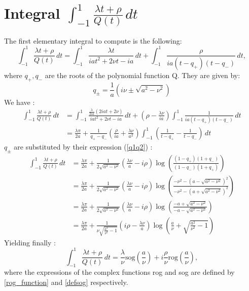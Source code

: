 \section[First elementary integral]{Integral $\int_{-1}^1 \frac{\lambda t+ \rho}{Q(t)}\, dt$}
\label{calculIntQ}
The first elementary integral to compute is the following:
\begin{equation}
\int_{-1}^1 \frac{\lambda t+ \rho}{Q(t)}\, dt=\int_{-1}^1 \frac{\lambda t}{iat^2+2\nu t-ia}\,dt+\int_{-1}^1\frac{\rho}{ia(t-q_+)(t-q_-)}\,dt,
\end{equation}
where $q_+,q_-$ are the roots of the polynomial function Q. They are given by:
\begin{equation}
q_\pm=\frac{1}{a}(i\nu\pm\sqrt{a^2-\nu^2})
\label{q1q2}
\end{equation}
We have :
\begin{equation}
\begin{split}
\int_{-1}^1 \frac{\lambda t+ \rho}{Q(t)}\, dt&=\int_{-1}^1 \frac{\frac{\lambda}{2ia} (2iat+2\nu)}{iat^2+2\nu t-ia}\,dt+(\rho-\frac{\lambda \nu}{ia})\int_{-1}^1\frac{1}{ia(t-q_+)(t-q_-)}\,dt\\
&=\frac{\lambda\pi}{2a}+\frac{1}{q_+-q_-}\left(\frac{\rho}{ia}+\frac{\lambda\nu}{a^2}\right)\int_{-1}^1\left(\frac{1}{t-q_+}-\frac{1}{t-q_-}\right)\,dt
\end{split}
\end{equation}
$q_\pm$ are substituted by their expression (\ref{q1q2}) :
\begin{equation}
\begin{split}
\int_{-1}^1 \frac{\lambda t+ \rho}{Q(t)}\, dt&=\frac{\lambda\pi}{2a}+\frac{1}{2\sqrt{a^2-\nu^2}}\left(\frac{\lambda\nu}{a}-i\rho\right)\log\left(\frac{(1-q_+)(1+q_-)}{(1-q_-)(1+q_+)}\right)\\
&=\frac{\lambda\pi}{2a}+\frac{1}{2\sqrt{a^2-\nu^2}}\left(\frac{\lambda\nu}{a}-i\rho\right)\log\left(\frac{-\nu^2-(a-\sqrt{a^2-\nu^2})^2}{-\nu^2-(a+\sqrt{a^2-\nu^2})^2}\right)\\
&=\frac{\lambda\pi}{2a}+\frac{1}{2\sqrt{a^2-\nu^2}}\left(\frac{\lambda\nu}{a}-i\rho\right)\log\left(\frac{-a+\sqrt{a^2-\nu^2}}{-a-\sqrt{a^2-\nu^2}}\right)\\
&=\frac{\lambda\pi}{2a}+\frac{1}{\nu\sqrt{\frac{a^2}{\nu^2}-1}}\left(i\rho-\frac{\lambda\nu}{a}\right)\log\left(\frac{a}{\nu}+\sqrt{\frac{a^2}{\nu^2}-1}\right)
\end{split}
\end{equation}
Yielding finally :
\begin{equation}
\int_{-1}^1 \frac{\lambda t+ \rho}{Q(t)}\, dt=\frac{\lambda}{\nu}\mbox{sog}(\frac{a}{\nu})+i\frac{\rho}{\nu}\mbox{rog}(\frac{a}{\nu}),
\label{intQ}
\end{equation}
where the expressions of the complex functions rog and sog are defined by \eqref{rog_function} and \eqref{defsog} respectively.

